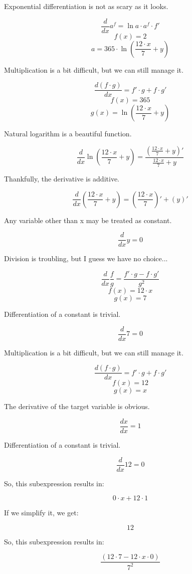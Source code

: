 \documentclass[12pt]{article}
\begin{document}
Exponential differentiation is not as scary as it looks.

$$ \frac{d}{dx} a^f = \ln{a} \cdot a^f \cdot f' $$
$$ f(x) =  2  $$
$$ a =  365  \cdot \ln \left(\frac{ 12  \cdot  x }{ 7 } +  y \right) $$

Multiplication is a bit difficult, but we can still manage it.

$$ \frac{d (f \cdot g)}{dx} = f' \cdot g + f \cdot g' $$
$$ f(x) =  365  $$
$$ g(x) = \ln \left(\frac{ 12  \cdot  x }{ 7 } +  y \right) $$

Natural logarithm is a beautiful function.

$$ \frac{d}{dx} \ln \left(\frac{ 12  \cdot  x }{ 7 } +  y \right) = \frac{\left(\frac{ 12  \cdot  x }{ 7 } +  y \right)'}{\frac{ 12  \cdot  x }{ 7 } +  y } $$

Thankfully, the derivative is additive.

$$ \frac{d}{dx} \left(\frac{ 12  \cdot  x }{ 7 } +  y \right) = \left(\frac{ 12  \cdot  x }{ 7 }\right)' + \left( y \right)' $$

Any variable other than x may be treated as constant.

$$ \frac{d}{dx} y = 0 $$

Division is troubling, but I guess we have no choice...

$$ \frac{d}{dx} \frac{f}{g} = \frac{f' \cdot g - f \cdot g'}{g^2} $$
$$ f(x) =  12  \cdot  x  $$
$$ g(x) =  7  $$

Differentiation of a constant is trivial.

$$ \frac{d}{dx} 7 = 0 $$

Multiplication is a bit difficult, but we can still manage it.

$$ \frac{d (f \cdot g)}{dx} = f' \cdot g + f \cdot g' $$
$$ f(x) =  12  $$
$$ g(x) =  x  $$

The derivative of the target variable is obvious.

$$ \frac{dx}{dx} = 1 $$

Differentiation of a constant is trivial.

$$ \frac{d}{dx} 12 = 0 $$

So, this subexpression results in:

$$  0  \cdot  x  +  12  \cdot  1  $$

If we simplify it, we get:

$$  12  $$

So, this subexpression results in:

$$ \frac{\left( 12  \cdot  7  -  12  \cdot  x  \cdot  0 \right)}{ 7 ^{ 2 }} $$
\end{document}
